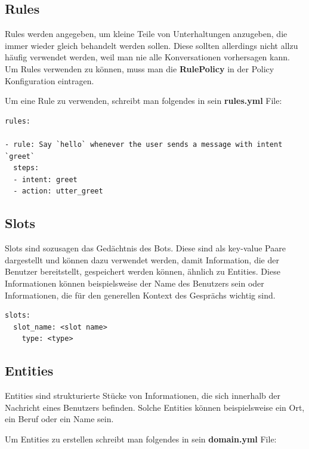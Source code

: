 \subsection{Rules}

Rules werden angegeben, um kleine Teile von Unterhaltungen anzugeben, die immer wieder gleich behandelt werden sollen.
Diese sollten allerdings nicht allzu häufig verwendet werden, weil man nie alle Konversationen vorhersagen kann.
Um Rules verwenden zu können, muss man die \textbf{RulePolicy} in der Policy Konfiguration eintragen.\cite{rules}

Um eine Rule zu verwenden, schreibt man folgendes in sein \textbf{rules.yml} File:

\begin{lstlisting}[label={lst: Rules Example}]
rules:

- rule: Say `hello` whenever the user sends a message with intent `greet`
  steps:
  - intent: greet
  - action: utter_greet
\end{lstlisting}

\subsection{Slots}

Slots sind sozusagen das Gedächtnis des Bots.
Diese sind als key-value Paare dargestellt und können dazu verwendet werden, damit Information, die der Benutzer bereitstellt, gespeichert werden können, ähnlich zu Entities.
Diese Informationen können beispielsweise der Name des Benutzers sein oder Informationen, die für den generellen Kontext des Gesprächs wichtig sind.
\cite{slots}

\begin{lstlisting}[label={lst: Slot Example}]
slots:
  slot_name: <slot name>
    type: <type>
\end{lstlisting}


\subsection{Entities}

Entities sind strukturierte Stücke von Informationen, die sich innerhalb der Nachricht eines Benutzers befinden.
Solche Entities können beispielsweise ein Ort, ein Beruf oder ein Name sein.\cite{entities}

Um Entities zu erstellen schreibt man folgendes in sein \textbf{domain.yml} File:

